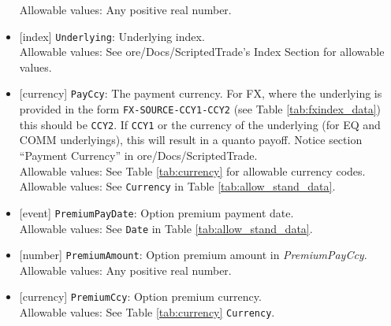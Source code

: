 \begin{itemize}
    Allowable values: Any positive real number.
    \item{}[index] \lstinline!Underlying!: Underlying index. \\
    Allowable values: See ore/Docs/ScriptedTrade's Index Section for allowable values.
    \item{}[currency] \lstinline!PayCcy!: The payment currency. For FX, where the underlying is provided
      in the form \lstinline!FX-SOURCE-CCY1-CCY2! (see Table \ref{tab:fxindex_data}) this should
      be \lstinline!CCY2!. If \lstinline!CCY1! or the currency of the underlying (for EQ and
      COMM underlyings), this will result in a quanto payoff. Notice section ``Payment Currency'' in ore/Docs/ScriptedTrade. \\
        Allowable values: See Table \ref{tab:currency} for allowable currency codes.
    Allowable values: See \lstinline!Currency! in Table \ref{tab:allow_stand_data}.
    \item{}[event] \lstinline!PremiumPayDate!: Option premium payment date. \\
    Allowable values: See \lstinline!Date! in Table \ref{tab:allow_stand_data}.
    \item{}[number] \lstinline!PremiumAmount!: Option premium amount in \emph{PremiumPayCcy}. \\
    Allowable values: Any positive real number.
    \item{}[currency] \lstinline!PremiumCcy!: Option premium currency. \\
    Allowable values: See Table \ref{tab:currency} \lstinline!Currency!.
\end{itemize}
